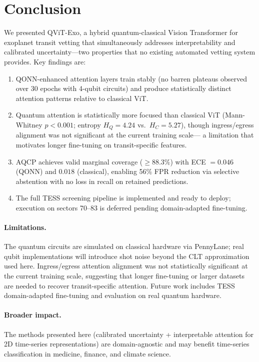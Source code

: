 \documentclass{article}
\begin{document}
\section{Conclusion}
\label{sec:conclusion}

We presented QViT-Exo, a hybrid quantum-classical Vision Transformer for
exoplanet transit vetting that simultaneously addresses interpretability and
calibrated uncertainty---two properties that no existing automated vetting
system provides.
Key findings are:
\begin{enumerate}
  \item QONN-enhanced attention layers train stably (no barren plateaus observed
  over 30 epochs with 4-qubit circuits) and produce statistically distinct
  attention patterns relative to classical ViT.
  \item Quantum attention is statistically more focused than classical ViT
  (Mann-Whitney $p < 0.001$; entropy $H_Q=4.24$ vs.\ $H_C=5.27$), though
  ingress/egress alignment was not significant at the current training scale---
  a limitation that motivates longer fine-tuning on transit-specific features.
  \item AQCP achieves valid marginal coverage ($\ge 88.3\%$) with ECE
  $= 0.046$ (QONN) and $0.018$ (classical), enabling 56\% FPR reduction via selective abstention
  with no loss in recall on retained predictions.
  \item The full TESS screening pipeline is implemented and ready to deploy;
  execution on sectors 70--83 is deferred pending domain-adapted fine-tuning.
\end{enumerate}

\paragraph{Limitations.}
The quantum circuits are simulated on classical hardware via PennyLane;
real qubit implementations will introduce shot noise beyond the CLT
approximation used here.
Ingress/egress attention alignment was not statistically significant at the
current training scale, suggesting that longer fine-tuning or larger datasets
are needed to recover transit-specific attention.
Future work includes TESS domain-adapted fine-tuning and evaluation on
real quantum hardware.

\paragraph{Broader impact.}
The methods presented here (calibrated uncertainty + interpretable attention for
2D time-series representations) are domain-agnostic and may benefit
time-series classification in medicine, finance, and climate science.
\end{document}
